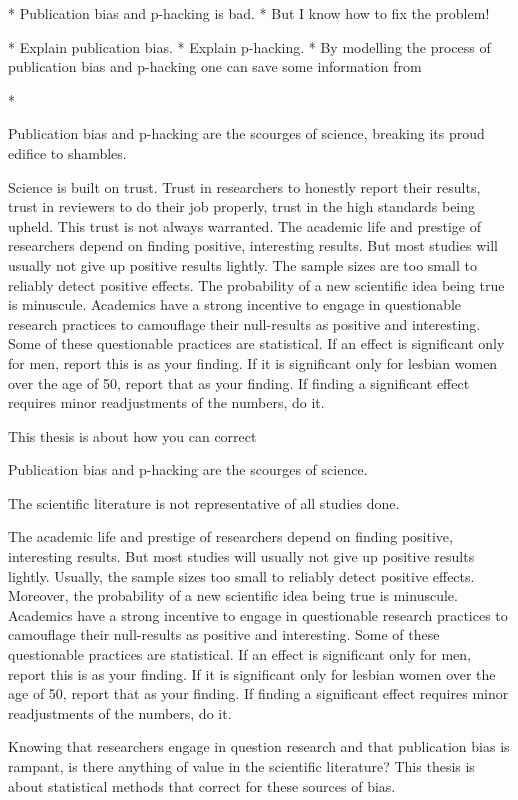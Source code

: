 \documentclass[english]{article}
\begin{document}
* Publication bias and p-hacking is bad.
* But I know how to fix the problem!

* Explain publication bias.
* Explain p-hacking.
* By modelling the process of publication bias and p-hacking one can save some information from 

* 

Publication bias and p-hacking are the scourges of science, breaking its proud edifice to shambles.


Science is built on trust. Trust in researchers to honestly report their results, trust in reviewers to do their job properly, trust in the high standards being upheld. This trust is not always warranted. The academic life and prestige of researchers depend on finding positive, interesting results. But most studies will usually not give up positive results lightly. The sample sizes are too small to reliably detect positive effects. The probability of a new scientific idea being true is minuscule. Academics have a strong incentive to engage in questionable research practices to camouflage their null-results as positive and interesting. Some of these questionable practices are statistical. If an effect is significant only for men, report this is as your finding. If it is significant only for lesbian women over the age of 50, report that as your finding. If finding a significant effect requires minor readjustments of the numbers, do it. 



This thesis is about how you can correct

Publication bias and p-hacking are the scourges of science.

The scientific literature is not representative of all studies done. 

The academic life and prestige of researchers depend on finding positive, interesting results. But most studies will usually not give up positive results lightly. Usually, the sample sizes too small to reliably detect positive effects. Moreover, the probability of a new scientific idea being true is minuscule. Academics have a strong incentive to engage in questionable research practices to camouflage their null-results as positive and interesting. Some of these questionable practices are statistical. If an effect is significant only for men, report this is as your finding. If it is significant only for lesbian women over the age of 50, report that as your finding. If finding a significant effect requires minor readjustments of the numbers, do it.

Knowing that researchers engage in question research and that publication bias is rampant, is there anything of value in the scientific literature? This thesis is about statistical methods that correct for these sources of bias.  
\end{document}
